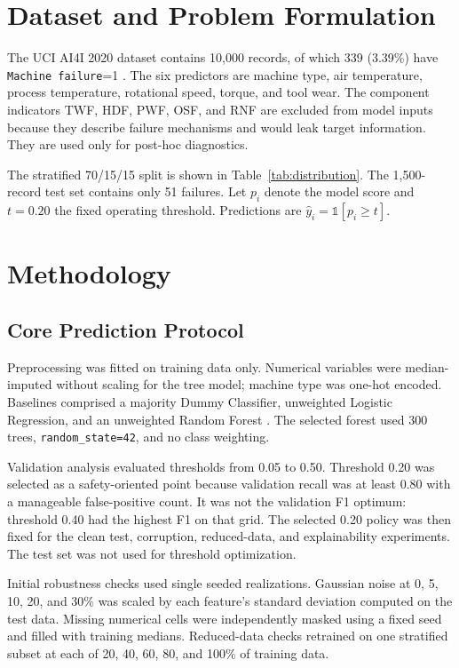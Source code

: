 \documentclass[conference]{IEEEtran}
\begin{document}
\section{Dataset and Problem Formulation}
The UCI AI4I 2020 dataset contains 10,000 records, of which 339 (3.39\%) have \texttt{Machine failure}=1 \cite{uci_ai4i}. The six predictors are machine type, air temperature, process temperature, rotational speed, torque, and tool wear. The component indicators TWF, HDF, PWF, OSF, and RNF are excluded from model inputs because they describe failure mechanisms and would leak target information. They are used only for post-hoc diagnostics.

The stratified 70/15/15 split is shown in Table~\ref{tab:distribution}. The 1,500-record test set contains only 51 failures. Let $p_i$ denote the model score and $t=0.20$ the fixed operating threshold. Predictions are $\hat y_i=\mathbb{1}[p_i\geq t]$.

\begin{table}[t]
\caption{Stratified Data Split}
\label{tab:distribution}
\centering

\end{table}

\section{Methodology}
\subsection{Core Prediction Protocol}
Preprocessing was fitted on training data only. Numerical variables were median-imputed without scaling for the tree model; machine type was one-hot encoded. Baselines comprised a majority Dummy Classifier, unweighted Logistic Regression, and an unweighted Random Forest \cite{breiman2001rf,pedregosa2011sklearn}. The selected forest used 300 trees, \texttt{random\_state=42}, and no class weighting.

Validation analysis evaluated thresholds from 0.05 to 0.50. Threshold 0.20 was selected as a safety-oriented point because validation recall was at least 0.80 with a manageable false-positive count. It was not the validation F1 optimum: threshold 0.40 had the highest F1 on that grid. The selected 0.20 policy was then fixed for the clean test, corruption, reduced-data, and explainability experiments. The test set was not used for threshold optimization.

Initial robustness checks used single seeded realizations. Gaussian noise at 0, 5, 10, 20, and 30\% was scaled by each feature's standard deviation computed on the test data. Missing numerical cells were independently masked using a fixed seed and filled with training medians. Reduced-data checks retrained on one stratified subset at each of 20, 40, 60, 80, and 100\% of training data.
\end{document}
